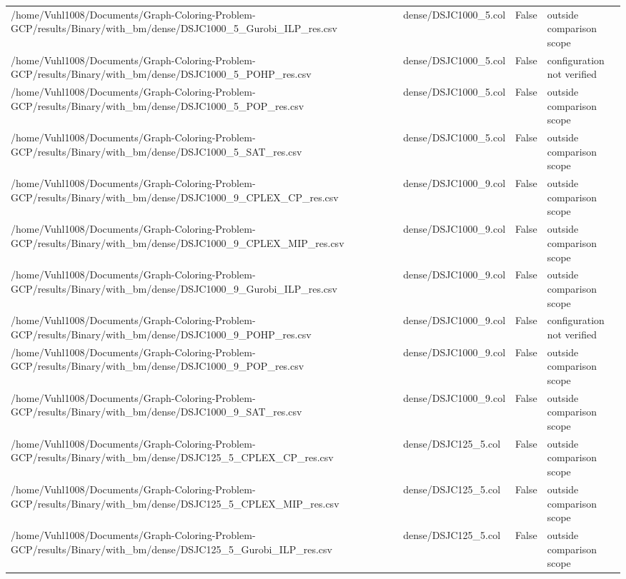 \begin{table}[htbp]
\begin{tabular}{llll}
/home/Vuhl1008/Documents/Graph-Coloring-Problem-GCP/results/Binary/with\_bm/dense/DSJC1000\_5\_Gurobi\_ILP\_res.csv & dense/DSJC1000\_5.col & False & outside comparison scope \\
/home/Vuhl1008/Documents/Graph-Coloring-Problem-GCP/results/Binary/with\_bm/dense/DSJC1000\_5\_POHP\_res.csv & dense/DSJC1000\_5.col & False & configuration not verified \\
/home/Vuhl1008/Documents/Graph-Coloring-Problem-GCP/results/Binary/with\_bm/dense/DSJC1000\_5\_POP\_res.csv & dense/DSJC1000\_5.col & False & outside comparison scope \\
/home/Vuhl1008/Documents/Graph-Coloring-Problem-GCP/results/Binary/with\_bm/dense/DSJC1000\_5\_SAT\_res.csv & dense/DSJC1000\_5.col & False & outside comparison scope \\
/home/Vuhl1008/Documents/Graph-Coloring-Problem-GCP/results/Binary/with\_bm/dense/DSJC1000\_9\_CPLEX\_CP\_res.csv & dense/DSJC1000\_9.col & False & outside comparison scope \\
/home/Vuhl1008/Documents/Graph-Coloring-Problem-GCP/results/Binary/with\_bm/dense/DSJC1000\_9\_CPLEX\_MIP\_res.csv & dense/DSJC1000\_9.col & False & outside comparison scope \\
/home/Vuhl1008/Documents/Graph-Coloring-Problem-GCP/results/Binary/with\_bm/dense/DSJC1000\_9\_Gurobi\_ILP\_res.csv & dense/DSJC1000\_9.col & False & outside comparison scope \\
/home/Vuhl1008/Documents/Graph-Coloring-Problem-GCP/results/Binary/with\_bm/dense/DSJC1000\_9\_POHP\_res.csv & dense/DSJC1000\_9.col & False & configuration not verified \\
/home/Vuhl1008/Documents/Graph-Coloring-Problem-GCP/results/Binary/with\_bm/dense/DSJC1000\_9\_POP\_res.csv & dense/DSJC1000\_9.col & False & outside comparison scope \\
/home/Vuhl1008/Documents/Graph-Coloring-Problem-GCP/results/Binary/with\_bm/dense/DSJC1000\_9\_SAT\_res.csv & dense/DSJC1000\_9.col & False & outside comparison scope \\
/home/Vuhl1008/Documents/Graph-Coloring-Problem-GCP/results/Binary/with\_bm/dense/DSJC125\_5\_CPLEX\_CP\_res.csv & dense/DSJC125\_5.col & False & outside comparison scope \\
/home/Vuhl1008/Documents/Graph-Coloring-Problem-GCP/results/Binary/with\_bm/dense/DSJC125\_5\_CPLEX\_MIP\_res.csv & dense/DSJC125\_5.col & False & outside comparison scope \\
/home/Vuhl1008/Documents/Graph-Coloring-Problem-GCP/results/Binary/with\_bm/dense/DSJC125\_5\_Gurobi\_ILP\_res.csv & dense/DSJC125\_5.col & False & outside comparison scope \\

\end{tabular}
\end{table}
